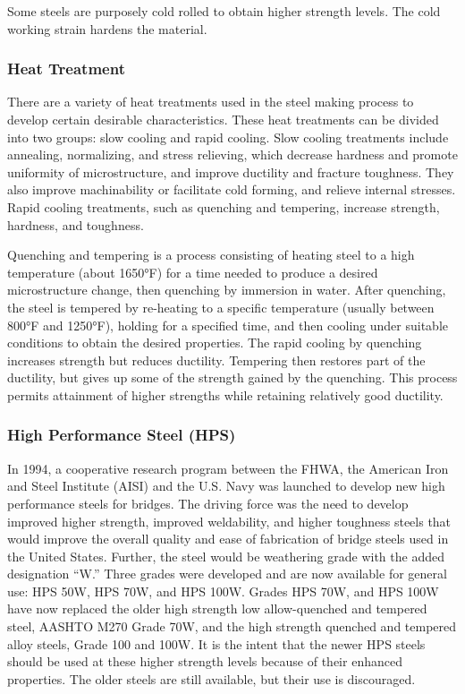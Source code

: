 Some steels are purposely cold rolled to obtain higher strength levels. The cold working strain hardens the
material.

\subsubsection{Heat Treatment}
There are a variety of heat treatments used in the steel making process to develop certain desirable
characteristics. These heat treatments can be divided into two groups: slow cooling and rapid cooling. Slow cooling
treatments include annealing, normalizing, and stress relieving, which decrease hardness and promote uniformity of
microstructure, and improve ductility and fracture toughness. They also improve machinability or facilitate cold
forming, and relieve internal stresses. Rapid cooling treatments, such as quenching and tempering, increase strength,
hardness, and toughness.

Quenching and tempering is a process consisting of heating steel to a high temperature (about 1650°F) for a time
needed to produce a desired microstructure change, then quenching by immersion in water. After quenching, the
steel is tempered by re-heating to a specific temperature (usually between 800°F and 1250°F), holding for a specified
time, and then cooling under suitable conditions to obtain the desired properties. The rapid cooling by quenching
increases strength but reduces ductility. Tempering then restores part of the ductility, but gives up some of the strength gained by the quenching. This process permits attainment of higher strengths while retaining relatively good
ductility.


\subsubsection{High Performance Steel (HPS)}
In 1994, a cooperative research program between the FHWA, the American Iron and Steel Institute (AISI) and
the U.S. Navy was launched to develop new high performance steels for bridges. The driving force was the need to
develop improved higher strength, improved weldability, and higher toughness steels that would improve the overall
quality and ease of fabrication of bridge steels used in the United States. Further, the steel would be weathering
grade with the added designation “W.” Three grades were developed and are now available for general use: HPS
50W, HPS 70W, and HPS 100W. Grades HPS 70W, and HPS 100W have now replaced the older high strength low
allow-quenched and tempered steel, AASHTO M270 Grade 70W, and the high strength quenched and tempered alloy
steels, Grade 100 and 100W. It is the intent that the newer HPS steels should be used at these higher strength levels
because of their enhanced properties. The older steels are still available, but their use is discouraged.

